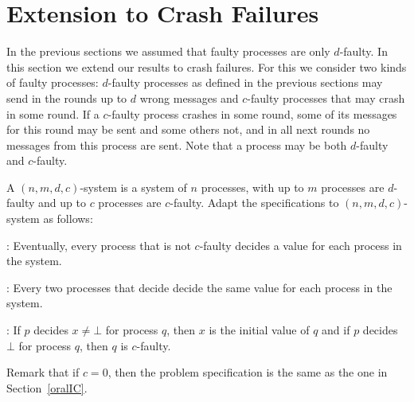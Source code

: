 \section{Extension to Crash Failures}
In the previous sections we assumed that faulty processes are only
$d$-faulty. In this section we extend our results to crash failures.
For this we consider two kinds of faulty processes: $d$-faulty processes as
defined in the previous sections may send in the rounds  up to $d$ wrong messages and
$c$-faulty processes that may crash in some round. If a
$c$-faulty process crashes in some round, some of its messages for this round
may be sent and some others not, and in all next rounds no messages from
this process are sent. 
Note that a process may be both $d$-faulty and $c$-faulty.

A $( n,m,d,c )$-system is a system of $n$ processes, with up to $m$
processes are $d$-faulty and up to $c$ processes are $c$-faulty.
Adapt the   specifications to $( n,m,d,c)$-system as follows:
  \begin{itemizedot}
    \item {}: Eventually, every process that is not $c$-faulty
     decides a value for each process in the system.
    
    \item {}: Every two processes that decide 
    decide the same value for each process in the system.
    
    \item {}: If $p$ decides $x\neq \bot $ for process $q$, then
           $x$ is the initial value of $q$ and if $p$ decides $\bot$
           for process $q$, then $q$ is $c$-faulty.
  \end{itemizedot}
Remark that if $c=0$, then the problem specification is the same as
the one in Section~\ref{oralIC}.


